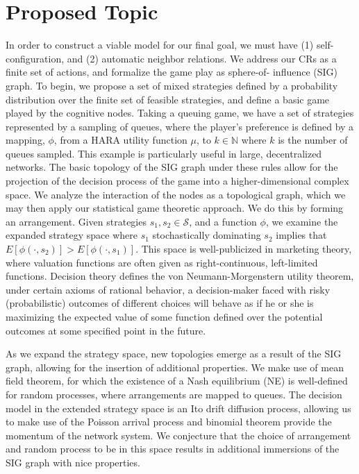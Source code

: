 \documentclass[10pt]{article}
\newcommand{\mcS}{\mathcal{S}}
\theoremstyle{definition}
\begin{document}
\section{Proposed Topic}

In order to construct a
viable model for our final goal, we must have (1) self-configuration, and (2) automatic neighbor
relations. We address our CRs as a finite set of actions, and formalize the game play as sphere-of-
influence (SIG) graph. To begin, we propose a set of mixed strategies defined by a probability
distribution over the finite set of feasible strategies, and define a basic game played by the
cognitive nodes.
Taking a queuing game, we have a set of strategies represented by a
sampling of queues, where the player's preference is defined by a mapping,
$\phi$, from a HARA utility
function $\mu$, to $k\in\mathbb{N}$ where $k$ is the number of queues sampled. This example is particularly useful in large, decentralized
networks. The basic topology of the SIG graph under these rules allow for the
projection of the decision process of the game into a higher-dimensional complex
space. We analyze the interaction of the nodes as a topological graph, which we
may then apply our statistical game theoretic approach. We do this by forming an
arrangement. Given strategies $s_1, s_2 \in \mcS$, and a function $\phi$, we examine the
expanded strategy space where $s_1$ stochastically dominating $s_2$ implies that
$E[\phi (\cdot, s_2 )] > E[\phi (\cdot, s_1 )]$. This space is well-publicized
in marketing theory, where valuation functions are often given as
right-continuous, left-limited functions. Decision theory defines the von Neumann-Morgenstern utility theorem, under certain axioms of rational behavior, a decision-maker faced with risky (probabilistic) outcomes of different choices will behave as if he or she is maximizing the expected value of some function defined over the potential outcomes at some specified point in the future. 

As we expand the strategy space, new topologies emerge as a result of the SIG
graph, allowing for the insertion of additional properties. We make use of mean
field theorem, for which the existence of a Nash equilibrium (NE) is
well-defined for random processes, where arrangements are mapped to queues.
The decision model in the extended strategy space is an Ito drift
diffusion process, allowing us to make use of the Poisson arrival process and binomial
theorem provide the momentum of the network system. We conjecture that the choice of arrangement and random process to be in this space results in additional immersions of the SIG graph with nice properties.
\end{document}
